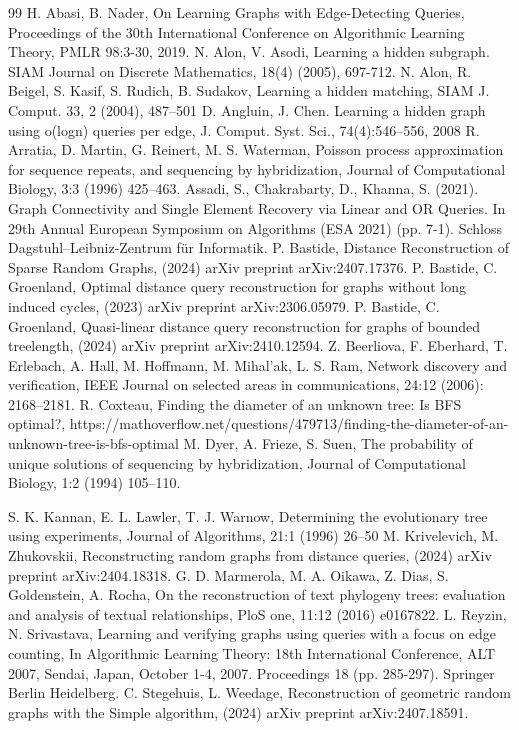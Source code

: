 \documentclass[12pt,a4paper]{amsart}
\theoremstyle{plain}
\theoremstyle{definition}
\begin{document}
\begin{thebibliography}{99}
H. Abasi, B. Nader, On Learning Graphs with Edge-Detecting Queries, Proceedings of the 30th International Conference on Algorithmic Learning Theory, PMLR 98:3-30, 2019.
N. Alon, V. Asodi, Learning a hidden subgraph. SIAM Journal on Discrete Mathematics, 18(4) (2005), 697-712.
 N. Alon, R. Beigel, S. Kasif, S. Rudich, B. Sudakov, Learning a
hidden matching, SIAM J. Comput. 33, 2 (2004), 487–501
D. Angluin, J. Chen. Learning a hidden graph using o(logn) queries per edge, J. Comput. Syst. Sci., 74(4):546–556, 2008
R. Arratia, D. Martin, G. Reinert, M. S. Waterman, Poisson process approximation for sequence repeats, and sequencing by hybridization, Journal of Computational Biology, 3:3 (1996) 425–463.
Assadi, S., Chakrabarty, D., Khanna, S. (2021). Graph Connectivity and Single Element Recovery via Linear and OR Queries. In 29th Annual European Symposium on Algorithms (ESA 2021) (pp. 7-1). Schloss Dagstuhl–Leibniz-Zentrum für Informatik.
P. Bastide, Distance Reconstruction of Sparse Random Graphs, (2024) arXiv preprint arXiv:2407.17376.
P. Bastide, C. Groenland, Optimal distance query reconstruction for graphs without long induced cycles, (2023) arXiv preprint arXiv:2306.05979.
P. Bastide, C. Groenland, Quasi-linear distance query reconstruction for graphs of bounded treelength, (2024) arXiv preprint arXiv:2410.12594.
Z. Beerliova, F. Eberhard, T. Erlebach, A. Hall, M. Hoffmann, M. Mihal’ak, L. S. Ram, Network discovery and verification, IEEE Journal on selected areas in communications, 24:12 (2006): 2168–2181.    
R. Coxteau, Finding the diameter of an unknown tree: Is BFS optimal?,  https://mathoverflow.net/questions/479713/finding-the-diameter-of-an-unknown-tree-is-bfs-optimal
M. Dyer, A. Frieze, S. Suen, The probability of unique solutions of sequencing by hybridization, Journal of Computational Biology, 1:2 (1994) 105–110.

 S. K. Kannan, E. L. Lawler, T. J. Warnow, Determining the evolutionary tree using experiments, Journal of Algorithms, 21:1 (1996) 26–50
M. Krivelevich, M. Zhukovskii,  Reconstructing random graphs from distance queries, (2024) arXiv preprint arXiv:2404.18318.
 G. D. Marmerola, M. A. Oikawa, Z. Dias, S. Goldenstein, A. Rocha, On the reconstruction of text phylogeny trees: evaluation and analysis of textual relationships, PloS one, 11:12 (2016) e0167822.
    L. Reyzin, N. Srivastava, Learning and verifying graphs using queries with a focus on edge counting, In Algorithmic Learning Theory: 18th International Conference, ALT 2007, Sendai, Japan, October 1-4, 2007. Proceedings 18 (pp. 285-297). Springer Berlin Heidelberg.
   C. Stegehuis, L. Weedage,  Reconstruction of geometric random graphs with the Simple algorithm, (2024) arXiv preprint arXiv:2407.18591.
\end{thebibliography}
\end{document}
